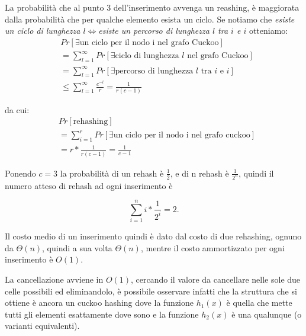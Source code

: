 La probabilità che al punto 3 dell'inserimento avvenga un reashing, è maggiorata
dalla probabilità che per qualche elemento esista un ciclo. Se notiamo che
\emph{esiste un ciclo di lunghezza $l$}$\Leftrightarrow$\emph{esiste un percorso di
lunghezza $l$ tra $i$ e $i$ } otteniamo:
\begin{align}
    &Pr\left[\exists \mbox{un ciclo per il nodo i nel grafo Cuckoo}\right] \nonumber \\
    &= \sum_{l=1}^{\infty} Pr\left[\exists \mbox{ciclo di lunghezza $l$ nel grafo Cuckoo}\right] \nonumber \\
    &= \sum_{l=1}^{\infty} Pr\left[\exists \mbox{percorso di lunghezza $l$ tra $i$ e $i$}\right] \nonumber \\
    &\le \sum_{l=1}^{\infty} \frac{c^{-l}}{r} = \frac{1}{r(c-1)} \nonumber
\end{align}

da cui:
\begin{align}
    &Pr\left[\mbox{rehashing}\right] \nonumber \\
    &= \sum_{i=1}^{r} Pr\left[\exists \mbox{un ciclo per il nodo i nel grafo cuckoo}\right] \nonumber \\
    &= r*\frac{1}{r(c-1)} = \frac{1}{c-1} \nonumber
\end{align}

Ponendo $c=3$ la probabilità di un rehash è $\frac{1}{2}$, e di n rehash è
$\frac{1}{2^n}$, quindi il numero atteso di rehash ad ogni inserimento è

\[ \sum_{i=1}^{n} i*\frac{1}{2^i} = 2. \]

Il costo medio di un inserimento quindi è dato dal costo di due rehashing, 
ognuno da $\Theta(n)$, quindi a sua volta $\Theta(n)$, mentre il costo
ammortizzato per ogni inserimento è $O(1)$.

La cancellazione avviene in $O(1)$, cercando il valore da cancellare nelle sole
due celle possibili ed eliminandolo, è possibile osservare infatti che la
struttura che si ottiene è ancora un cuckoo hashing dove la funzione $h_1(x)$
è quella che mette tutti gli elementi esattamente dove sono e la funzione
$h_2(x)$ è una qualunque (o varianti equivalenti).